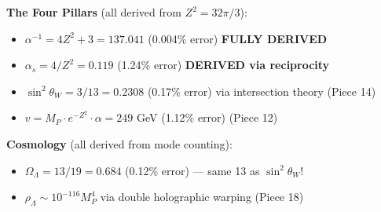 \documentclass[12pt,a4paper]{article}
\newcommand{\sinW}{\sin^2\theta_W}
\newcommand{\Zsq}{Z^2}
\begin{document}
\begin{tcolorbox}[colback=green!10!white, colframe=green!60!black, title=What Is Established (v8.8.8)]
\begin{itemize}[itemsep=0pt]
\end{itemize}
\textbf{The Four Pillars} (all derived from $\Zsq = 32\pi/3$):
\begin{itemize}[itemsep=0pt]
    \item $\alpha^{-1} = 4\Zsq + 3 = 137.041$ (0.004\% error) \textbf{FULLY DERIVED}
    \item $\alpha_s = 4/\Zsq = 0.119$ (1.24\% error) \textbf{DERIVED via reciprocity}
    \item $\sinW = 3/13 = 0.2308$ (0.17\% error) via intersection theory (Piece 14)
    \item $v = M_P \cdot e^{-\Zsq} \cdot \alpha = 249$ GeV (1.12\% error) (Piece 12)
\end{itemize}
\textbf{Cosmology} (all derived from mode counting):
\begin{itemize}[itemsep=0pt]
    \item $\Omega_\Lambda = 13/19 = 0.684$ (0.12\% error) --- same 13 as $\sinW$!
    \item $\rho_\Lambda \sim 10^{-116} M_P^4$ via double holographic warping (Piece 18)
\end{itemize}
\end{tcolorbox}
\end{document}
